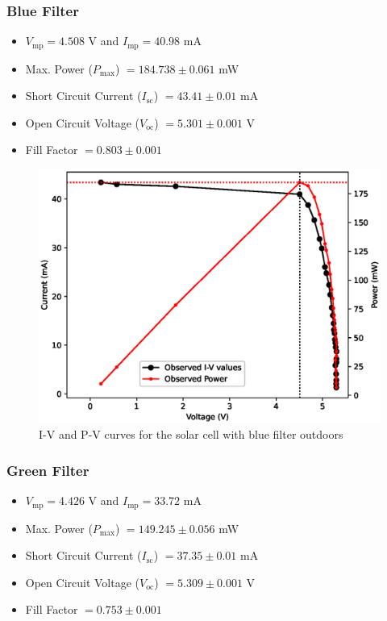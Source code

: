 
\subsubsection{Blue Filter}
\begin{itemize}
    \item $V_\text{mp} = 4.508$ V and $I_\text{mp} = 40.98$ mA
    \item Max. Power ($P_\text{max}$) $= 184.738 \pm 0.061 $ mW
    \item Short Circuit Current ($I_\text{sc}$) $= 43.41 \pm 0.01$ mA
    \item Open Circuit Voltage ($V_\text{oc}$) $= 5.301 \pm 0.001$ V
    \item Fill Factor $= 0.803 \pm 0.001$
\end{itemize}

\begin{figure}[H]
    \centering
    \includegraphics[width=1\columnwidth]{images/out/blue.eps}
    \caption{I-V and P-V curves for the solar cell with blue filter outdoors}
\end{figure}


\subsubsection{Green Filter}
\begin{itemize}
    \item $V_\text{mp} = 4.426$ V and $I_\text{mp} = 33.72$ mA
    \item Max. Power ($P_\text{max}$) $= 149.245 \pm 0.056 $ mW
    \item Short Circuit Current ($I_\text{sc}$) $= 37.35 \pm 0.01$ mA
    \item Open Circuit Voltage ($V_\text{oc}$) $= 5.309 \pm 0.001$ V
    \item Fill Factor $= 0.753 \pm 0.001$
\end{itemize}

